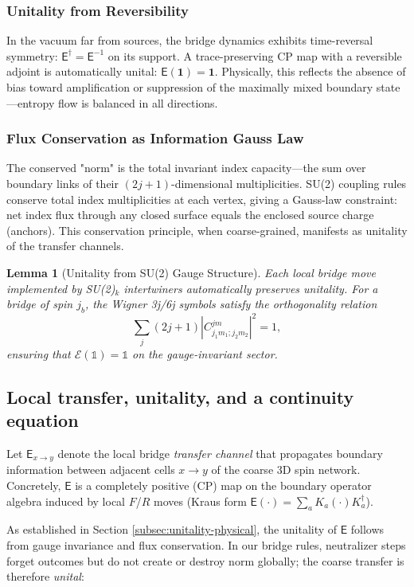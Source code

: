 \documentclass[11pt]{article}
\theoremstyle{plain}
\newtheorem{lemma}[theorem]{Lemma}
\theoremstyle{definition}
\begin{document}
\subsubsection{Unitality from Reversibility}
In the vacuum far from sources, the bridge dynamics exhibits time-reversal symmetry: $\mathsf{E}^\dagger = \mathsf{E}^{-1}$ on its support. A trace-preserving CP map with a reversible adjoint is automatically unital: $\mathsf{E}(\mathbf{1}) = \mathbf{1}$. Physically, this reflects the absence of bias toward amplification or suppression of the maximally mixed boundary state—entropy flow is balanced in all directions.

\subsubsection{Flux Conservation as Information Gauss Law}
The conserved "norm" is the total invariant index capacity—the sum over boundary links of their $(2j+1)$-dimensional multiplicities. SU(2) coupling rules conserve total index multiplicities at each vertex, giving a Gauss-law constraint: net index flux through any closed surface equals the enclosed source charge (anchors). This conservation principle, when coarse-grained, manifests as unitality of the transfer channels.

\begin{lemma}[Unitality from SU(2) Gauge Structure]
  Each local bridge move implemented by SU(2)$_k$ intertwiners automatically preserves unitality. For a bridge of spin $j_b$, the Wigner 3j/6j symbols satisfy the orthogonality relation
  \[
    \sum_j (2j+1) |C^{jm}_{j_1 m_1; j_2 m_2}|^2 = 1,
  \]
  ensuring that $\mathcal{E}(\mathbb{1}) = \mathbb{1}$ on the gauge-invariant sector.
\end{lemma}

\subsection{Local transfer, unitality, and a continuity equation}
Let $\mathsf{E}_{x\to y}$ denote the local bridge \emph{transfer channel} that propagates boundary information between adjacent cells $x\to y$ of the coarse 3D spin network.
Concretely, $\mathsf{E}$ is a completely positive (CP) map on the boundary operator algebra induced by local $F$/$R$ moves (Kraus form $\mathsf{E}(\cdot)=\sum_a K_a(\cdot)K_a^\dagger$).

As established in Section \ref{subsec:unitality-physical}, the unitality of $\mathsf{E}$ follows from gauge invariance and flux conservation. In our bridge rules, neutralizer steps forget outcomes but do not create or destroy norm globally; the coarse transfer is therefore \emph{unital}:
\end{document}
